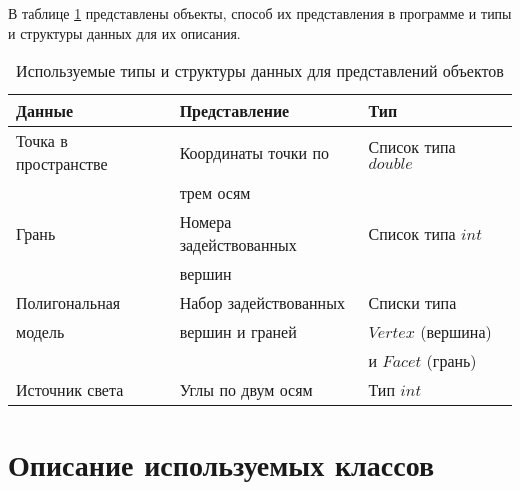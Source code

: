 В таблице \ref{tbl:types} представлены объекты, способ их представления в программе и типы и структуры данных для их описания.

\begin{table}[h]
\begin{center}
    \captionsetup{justification=raggedleft}
    \caption{\label{tbl:types}Используемые типы и структуры данных для представлений объектов}
    \begin{tabular}{|l|l|l|}
        \hline
        Данные & Представление & Тип\\
        \hline
        Точка в пространстве & Координаты точки по & Список типа $double$ \\ 
                             & трем осям     &                      \\ 
        \hline
        Грань & Номера задействованных & Список типа $int$ \\ 
              & вершин                 &                   \\ 
        \hline
        Полигональная        & Набор задействованных & Списки типа \\ 
        модель               & вершин и граней       & $Vertex$ (вершина) \\
                             &                       & и $Facet$ (грань) \\ 

        \hline
        Источник света & Углы по двум осям & Тип $int$ \\ 
        \hline
    \end{tabular}
\end{center}
\end{table}

\section{Описание используемых классов}

